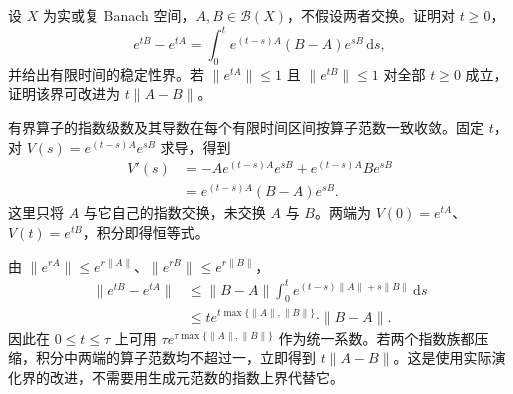 \BookExercises

\begin{exercise}\label{b2:ex:app-D-1}
设 \(X\) 为实或复 Banach 空间，\(A,B\in\mathcal B(X)\)，不假设两者交换。证明对 \(t\geq0\)，
\[
 e^{tB}-e^{tA}
 =\int_0^t e^{(t-s)A}(B-A)e^{sB}\,\mathrm ds,
\]
并给出有限时间的稳定性界。若 \(\|e^{tA}\|\leq1\) 且 \(\|e^{tB}\|\leq1\) 对全部 \(t\geq0\) 成立，证明该界可改进为 \(t\|A-B\|\)。
\end{exercise}
\begin{solution}
有界算子的指数级数及其导数在每个有限时间区间按算子范数一致收敛。固定 \(t\)，对 \(V(s)=e^{(t-s)A}e^{sB}\) 求导，得到
\[
 \begin{aligned}
 V'(s)
 &=-Ae^{(t-s)A}e^{sB}+e^{(t-s)A}Be^{sB}\\
 &=e^{(t-s)A}(B-A)e^{sB}.
 \end{aligned}
\]
这里只将 \(A\) 与它自己的指数交换，未交换 \(A\) 与 \(B\)。两端为 \(V(0)=e^{tA}\)、\(V(t)=e^{tB}\)，积分即得恒等式。

由 \(\|e^{rA}\|\leq e^{r\|A\|}\)、\(\|e^{rB}\|\leq e^{r\|B\|}\)，
\[
 \begin{aligned}
 \|e^{tB}-e^{tA}\|
 &\leq\|B-A\|\int_0^te^{(t-s)\|A\|+s\|B\|}\,\mathrm ds\\
 &\leq t e^{t\max\{\|A\|,\|B\|\}}\cdot\|B-A\|.
 \end{aligned}
\]
因此在 \(0\leq t\leq\tau\) 上可用 \(\tau e^{\tau\max\{\|A\|,\|B\|\}}\) 作为统一系数。若两个指数族都压缩，积分中两端的算子范数均不超过一，立即得到 \(t\|A-B\|\)。这是使用实际演化界的改进，不需要用生成元范数的指数上界代替它。
\end{solution}

